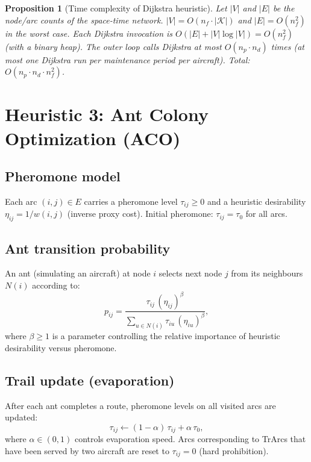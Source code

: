 \documentclass[11pt, a4paper]{article}
\theoremstyle{plain}
\newtheorem{proposition}{Proposition}
\theoremstyle{definition}
\theoremstyle{remark}
\newcommand{\K}{\mathcal{K}}
\begin{document}
\begin{proposition}[Time complexity of Dijkstra heuristic]
  Let $|V|$ and $|E|$ be the node/arc counts of the space-time network.
  $|V| = O(n_f \cdot |\K|)$ and $|E| = O(n_f^2)$ in the worst case.
  Each Dijkstra invocation is $O(|E| + |V|\log|V|) = O(n_f^2)$ (with a
  binary heap).  The outer loop calls Dijkstra at most $O(n_p \cdot n_d)$
  times (at most one Dijkstra run per maintenance period per aircraft).
  Total: $O(n_p \cdot n_d \cdot n_f^2)$.
\end{proposition}

\section{Heuristic 3: Ant Colony Optimization (ACO)}

\subsection{Pheromone model}

Each arc $(i, j) \in E$ carries a pheromone level $\tau_{ij} \ge 0$ and a
heuristic desirability $\eta_{ij} = 1 / w(i,j)$ (inverse proxy cost).
Initial pheromone: $\tau_{ij} = \tau_0$ for all arcs.

\subsection{Ant transition probability}

An ant (simulating an aircraft) at node $i$ selects next node $j$ from its
neighbours $N(i)$ according to:
\begin{equation}\label{eq:aco-prob}
  p_{ij} = \frac{\tau_{ij}\,(\eta_{ij})^\beta}{\displaystyle\sum_{u \in N(i)}
    \tau_{iu}\,(\eta_{iu})^\beta},
\end{equation}
where $\beta \ge 1$ is a parameter controlling the relative importance of
heuristic desirability versus pheromone.

\subsection{Trail update (evaporation)}

After each ant completes a route, pheromone levels on all visited arcs are
updated:
\begin{equation}\label{eq:aco-evap}
  \tau_{ij} \leftarrow (1 - \alpha)\,\tau_{ij} + \alpha\,\tau_0,
\end{equation}
where $\alpha \in (0, 1)$ controls evaporation speed.  Arcs corresponding to
TrArcs that have been served by two aircraft are reset to $\tau_{ij} = 0$
(hard prohibition).
\end{document}
